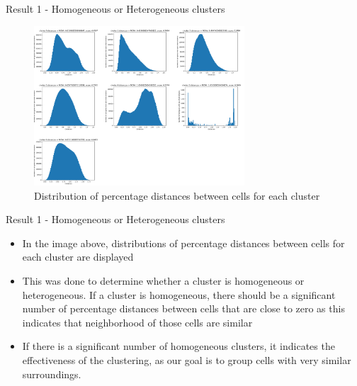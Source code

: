 \documentclass{beamer}
\begin{document}
\begin{frame}{Result 1 - Homogeneous or Heterogeneous clusters}

\begin{figure}
    \centering
    \includegraphics[width=0.7\textwidth]{stats_clusters2.png}
    \caption{Distribution of percentage distances between cells for each cluster}
\end{figure} 

\end{frame}
\begin{frame}{Result 1 - Homogeneous or Heterogeneous clusters}

\begin{itemize}
    \item<1-> In the image above, distributions of percentage distances between cells for each cluster are displayed
    \item<2-> This was done to determine whether a cluster is homogeneous or heterogeneous. If a cluster is homogeneous, there should be a significant number of percentage distances between cells that are close to zero as this indicates that neighborhood of those cells are similar
    \item<3-> If there is a significant number of homogeneous clusters, it indicates the effectiveness of the clustering, as our goal is to group cells with very similar surroundings. 
\end{itemize}
\end{frame}
\end{document}
